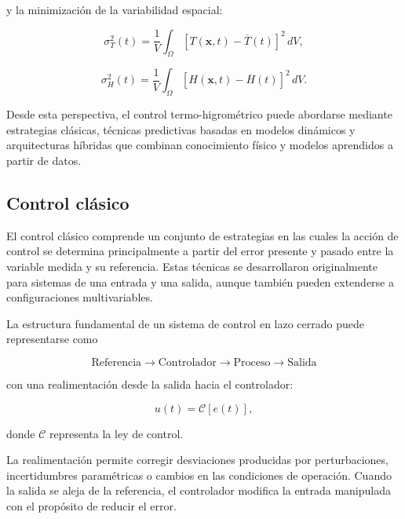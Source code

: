 y la minimización de la variabilidad espacial:

\begin{equation}
\sigma_T^2(t)
=
\frac{1}{V}
\int_{\Omega}
\left[
T(\mathbf{x},t)-\overline{T}(t)
\right]^2
\,dV,
\end{equation}

\begin{equation}
\sigma_H^2(t)
=
\frac{1}{V}
\int_{\Omega}
\left[
H(\mathbf{x},t)-\overline{H}(t)
\right]^2
\,dV.
\end{equation}

Desde esta perspectiva, el control termo-higrométrico puede abordarse mediante estrategias clásicas, técnicas predictivas basadas en modelos dinámicos y arquitecturas híbridas que combinan conocimiento físico y modelos aprendidos a partir de datos.

\subsection{Control clásico}
\label{subsec:control_clasico}

El control clásico comprende un conjunto de estrategias en las cuales la acción de control se determina principalmente a partir del error presente y pasado entre la variable medida y su referencia. Estas técnicas se desarrollaron originalmente para sistemas de una entrada y una salida, aunque también pueden extenderse a configuraciones multivariables.

La estructura fundamental de un sistema de control en lazo cerrado puede representarse como

\begin{equation}
\boxed{
\text{Referencia}
\longrightarrow
\text{Controlador}
\longrightarrow
\text{Proceso}
\longrightarrow
\text{Salida}
}
\end{equation}

con una realimentación desde la salida hacia el controlador:

\begin{equation}
u(t)
=
\mathcal{C}
\left[
e(t)
\right],
\end{equation}

donde $\mathcal{C}$ representa la ley de control.

La realimentación permite corregir desviaciones producidas por perturbaciones, incertidumbres paramétricas o cambios en las condiciones de operación. Cuando la salida se aleja de la referencia, el controlador modifica la entrada manipulada con el propósito de reducir el error.

